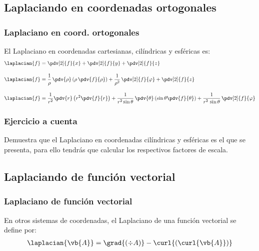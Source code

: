 \subsection{Laplaciando en coordenadas ortogonales}
\begin{frame}
\frametitle{Laplaciano en coord. ortogonales}
El Laplaciano en coordenadas cartesianas, cilíndricas y esféricas es:
\fontsize{12}{12}\selectfont
\begin{align*}
\laplacian{f} &= \pdv[2]{f}{x} + \pdv[2]{f}{y} + \pdv[2]{f}{z} \\[1em]
\laplacian{f} &= \dfrac{1}{\rho} \, \pdv{\rho} \left( \rho \, \pdv{f}{\rho} \right) + \dfrac{1}{\rho^{2}} \, \pdv[2]{f}{\varphi} + \pdv[2]{f}{z} \\[1em]
\laplacian{f} &= \dfrac{1}{r^{2}} \pdv{r} \left( r^{2} \pdv{f}{r} \right) + \dfrac{1}{r^{2} \sin \theta} \, \pdv{\theta} \left( \sin \theta \pdv{f}{\theta} \right) + \dfrac{1}{r^{2} \, \sin \theta} \, \pdv[2]{f}{\varphi}
\end{align*}
\end{frame}
\begin{frame}
\frametitle{Ejercicio a cuenta}
Demuestra que el Laplaciano en coordenadas cilíndricas y esféricas es el que se presenta, para ello tendrás que calcular los respectivos factores de escala.
\end{frame}
\subsection*{Laplaciando de función vectorial}
\begin{frame}
\frametitle{Laplaciano de función vectorial}
En otros sistemas de coordenadas, el Laplaciano de una función vectorial se define por:
\begin{align*}
\laplacian{\vb{A}} = \grad{(\div{A})} - \curl{(\curl{\vb{A}})}
\end{align*}
\end{frame}
